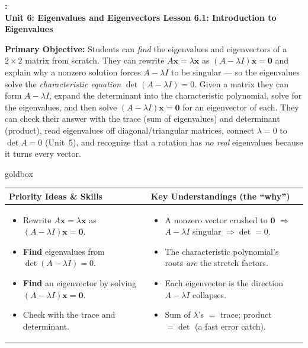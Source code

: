 \documentclass[10pt]{article}
\newcommand{\xx}{\mathbf{x}}
\newcommand{\zero}{\mathbf{0}}
\newcommand{\UnitNumberName}{Unit 6: Eigenvalues and Eigenvectors \quad}
\newcommand{\LessonNumberName}{Lesson 6.1: Introduction to Eigenvalues}
\begin{document}
\begin{center}
    {\Large\bfseries \CourseName: \SchoolYear \\
    {\small\bfseries \UnitNumberName \LessonNumberName}}
\end{center}

\begin{tcolorbox}[colback=blush, colframe=burgundy, boxrule=0.9pt, arc=2mm,
    left=2mm, right=2mm, top=1.5mm, bottom=1.5mm]
    \textbf{Primary Objective:} Students can \emph{find} the eigenvalues and eigenvectors of a
    $2\times2$ matrix from scratch. They can rewrite $A\xx=\lambda\xx$ as $(A-\lambda I)\xx=\zero$
    and explain why a nonzero solution forces $A-\lambda I$ to be singular --- so the eigenvalues
    solve the \emph{characteristic equation} $\det(A-\lambda I)=0$. Given a matrix they can form
    $A-\lambda I$, expand the determinant into the characteristic polynomial, solve for the
    eigenvalues, and then solve $(A-\lambda I)\xx=\zero$ for an eigenvector of each. They can check
    their answer with the trace (sum of eigenvalues) and determinant (product), read eigenvalues off
    diagonal/triangular matrices, connect $\lambda=0$ to $\det A=0$ (Unit~5), and recognize that a
    rotation has \emph{no real} eigenvalues because it turns every vector.
\end{tcolorbox}

\renewcommand{\arraystretch}{1.4}
\begin{skillbox}{goldbox}
\begin{tabularx}{\linewidth}{@{}X|X@{}}
\textbf{Priority Ideas \& Skills} & \textbf{Key Understandings (the ``why'')} \\[2pt]
\hline
\vspace{-6pt}
\begin{itemize}[leftmargin=1.1em, nosep, after=\vspace{2pt}]
  \item Rewrite $A\xx=\lambda\xx$ as $(A-\lambda I)\xx=\zero$.
  \item \textbf{Find} eigenvalues from $\det(A-\lambda I)=0$.
  \item \textbf{Find} an eigenvector by solving $(A-\lambda I)\xx=\zero$.
  \item Check with the trace and determinant.
\end{itemize}
&
\vspace{-6pt}
\begin{itemize}[leftmargin=1.1em, nosep, after=\vspace{2pt}]
  \item A nonzero vector crushed to $\zero$ $\Rightarrow$ $A-\lambda I$ singular $\Rightarrow\det=0$.
  \item The characteristic polynomial's roots \emph{are} the stretch factors.
  \item Each eigenvector is the direction $A-\lambda I$ collapses.
  \item Sum of $\lambda$'s $=$ trace; product $=\det$ (a fast error catch).
\end{itemize}
\end{tabularx}
\end{skillbox}
\end{document}
